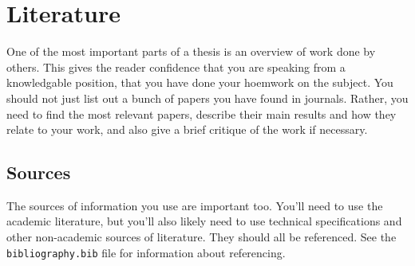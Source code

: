 \chapter{Literature}

One of the most important parts of a thesis is an overview of work done by
others.
This gives the reader confidence that you are speaking from a knowledgable
position, that you have done your hoemwork on the subject.
You should not just list out a bunch of papers you have found in journals.
Rather, you need to find the most relevant papers, describe their main results
and how they relate to your work, and also give a brief critique of the work if
necessary.


\section{Sources}
The sources of information you use are important too.
You'll need to use the academic literature, but you'll also likely need to use
technical specifications and other non-academic sources of literature.
They should all be referenced.
See the \texttt{bibliography.bib} file for information about referencing.

\lipsum[16-25]
